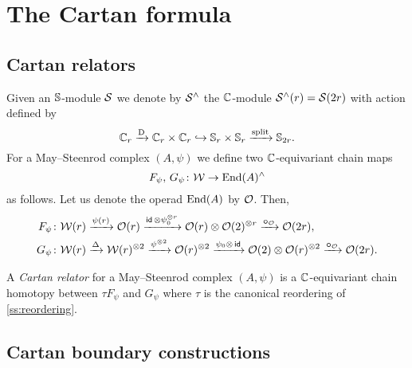 
\section{The Cartan formula}\label{s:cartan}

\subsection{Cartan relators}

Given an $\mathbb{S}$-module $\mathcal{S}$ we denote by $\mathcal{S}^\wedge$ the $\mathbb{C}$-module $\mathcal{S}^\wedge(r) = \mathcal{S}(2r)$ with
action defined by
\begin{equation}\label{eq:cyclic to 2-symetric}
	\mathbb{C}_r \xrightarrow{\mathrm{D}}
	\mathbb{C}_r \times \mathbb{C}_r \hookrightarrow
	\mathbb{S}_r \times \mathbb{S}_r \xrightarrow{\mathrm{split}}
	\mathbb{S}_{2r}.
\end{equation}
For a May--Steenrod complex $(A,\psi)$ we define two $\mathbb{C}$-equivariant chain maps
\[
F_\psi,\, G_\psi \colon \mathcal{W} \to \mathrm{End}(A)^\wedge
\]
as follows.
Let us denote the operad $\mathrm{End}(A)$ by $\mathcal{O}$.
Then,
\begin{align*}
	F_\psi \colon& \mathcal{W}(r) \xrightarrow{\psi(r)} \mathcal{O}(r) \xrightarrow{\mathsf{id}\, \otimes \psi_0^{\otimes r}}
	\mathcal{O}(r) \otimes \mathcal{O}(2)^{\otimes r} \xrightarrow{\bm{\circ}_{\mathcal{O}}}
	\mathcal{O}(2r), \\
	G_\psi \colon& \mathcal{W}(r) \xrightarrow{\Delta}
	\mathcal{W}(r)^{\otimes 2} \xrightarrow{\psi^{\otimes 2}}
	\mathcal{O}(r)^{\otimes 2} \xrightarrow{\psi_0 \otimes\, \mathsf{id}}
	\mathcal{O}(2) \otimes \mathcal{O}(r)^{\otimes 2} \xrightarrow{\bm{\circ}_{\mathcal{O}}}
	\mathcal{O}(2r).
\end{align*}

\begin{definition*}
	A \textit{Cartan relator} for a May--Steenrod complex $(A, \psi)$ is a $\mathbb{C}$-equivariant chain homotopy between $\tau F_\psi$ and $G_\psi$ where $\tau$ is the canonical reordering of \cref{ss:reordering}.
\end{definition*}

\subsection{Cartan boundary constructions}


